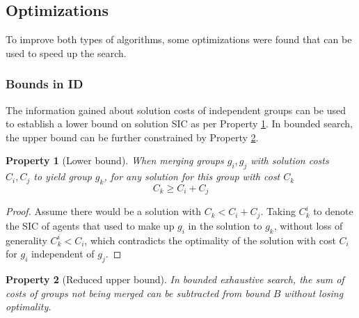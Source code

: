\documentclass[english]{article}
\newtheorem{property}{Property}
\begin{document}
	\subsection{Optimizations}
	To improve both types of algorithms, some optimizations were found that can be used to speed up the search.
	\subsubsection{Bounds in ID}
	The information gained about solution costs of independent groups can be used to establish a lower bound on solution SIC as per Property \ref{property:id-lower}. In bounded search, the upper bound can be further constrained by Property \ref{property:id-upper}.
	\begin{property}[Lower bound]
		When merging groups $g_i,g_j$ with solution costs $C_i,C_j$ to yield group $g_k$, for any solution for this group with cost $C_k$
		\[C_k\geq C_i + C_j\]
		\label{property:id-lower}
	\end{property}
	\begin{proof}
		Assume there would be a solution with $C_k < C_i + C_j$. Taking $C_k^i$ to denote the SIC of agents that used to make up $g_i$ in the solution to $g_k$, without loss of generality $C_k^i < C_i$, which contradicts the optimality of the solution with cost $C_i$ for $g_i$ independent of $g_j$.
	\end{proof}
	\begin{property}[Reduced upper bound]
		In bounded exhaustive search, the sum of costs of groups not being merged can be subtracted from bound $B$ without losing optimality.
		\label{property:id-upper}
	\end{property}
\end{document}
